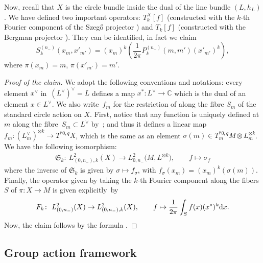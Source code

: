 \documentclass[pdftex]{sigma}
\numberwithin{equation}{section}
\begin{document}
	Now, recall that $X$ is the circle bundle inside the dual of the line bundle $(L, h_L)$. We have defined two important operators: $T_{k}^X[f]$ \big(constructed with the $k$-th Fourier component of the Szeg\H{o} projector \big) and $T_{k}[f]$ \big(constructed with the Bergman projector \big). They can be identified, in fact we claim
	\[S_{k}^{(n_-)}(x_m,x'_{m'})=(x_m)^k \left(\frac{1}{2\pi}P_{k}^{(n_-)}(m,m')(x'_{m'})^k \right) , \]
	where $\pi(x_m)=m$, $\pi(x'_{m'})=m'$.
	
	\begin{proof}[Proof of the claim]
		We adopt the following conventions and notations: every element $x^{\vee}$ in~$ {(L^{\vee})^{\vee}=L}$ defines a map $x^* \colon L^{\vee}\rightarrow \mathbb{C}$ which is the dual of an element $x\in L^{\vee}$. We also write~$f_m$ for the restriction of  along the fibre $S_m$ of the standard circle action on $X$. First, notice that any function  is uniquely defined at $m$ along the fibre~${S_m\subset L^{\vee}}$ by~;
		and thus it defines a linear map ${f_m \colon (L^{\vee}_m)^{\otimes k}\rightarrow T^{*0,q}X}$, which is the same as an element $\sigma(m) \in T^{*0,q}_mM\otimes L^{\otimes k}_m$.
		We have the following isomorphism:
		\begin{align*}\mathfrak{S}_k \colon\ L^2_{(0,n_-),k}(X) \rightarrow L^2_{0,n_-}\bigl(M,L^{\otimes k}\bigr) ,\qquad
			f\mapsto \sigma_f\end{align*}	
		where the inverse of $\mathfrak{S}_k$ is given by $\sigma \mapsto f_{\sigma}$, with $f_{\sigma}(x_m)=(x_m)^k(\sigma(m))$. Finally, the operator given by taking the $k$-th Fourier component along the fibers $S$ of $\pi \colon X\rightarrow M$ is given explicitly~by
		\begin{align*}F_k \colon\ L^2_{(0,n_-)}(X) \rightarrow L^2_{(0,n_-),k}(X),\qquad
			f\mapsto \frac{1}{2\pi}\int_S f(x) (x^*)^k {\rm d}x .\end{align*}
		Now, the claim follows by the formula
		.	
	\end{proof}

\subsection{Group action framework}
\end{document}
